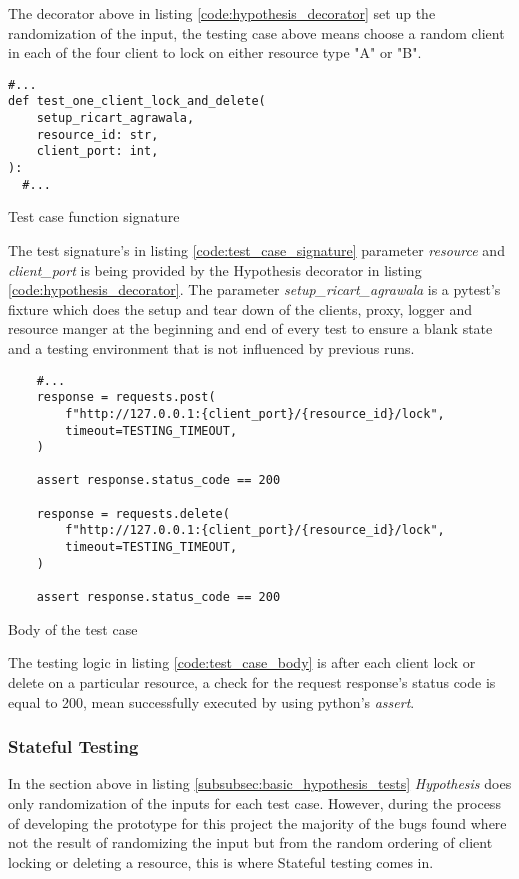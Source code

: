 The decorator above in listing \ref{code:hypothesis_decorator} set up the randomization of the input, the testing case above 
means choose a random client in each of the four client to lock on either resource 
type "A" or "B".

\begin{listing}[!ht]
  \begin{verbatim}
#...
def test_one_client_lock_and_delete(
    setup_ricart_agrawala,
    resource_id: str,
    client_port: int,
):
  #...
  \end{verbatim}
  \caption{Test case function signature}
  \label{code:test_case_signature}
\end{listing}

The test signature's in listing \ref{code:test_case_signature} parameter \textit{resource} 
and \textit{client\_port} is being provided by the Hypothesis decorator 
in listing \ref{code:hypothesis_decorator}. The parameter \textit{setup\_ricart\_agrawala}
is a pytest's fixture which does the setup and tear down of the clients, proxy, logger 
and resource manger at the beginning and end of every test to ensure a blank state 
and a testing environment that is not influenced by previous runs.

\begin{listing}[!ht]
  \begin{verbatim}
    #...
    response = requests.post(
        f"http://127.0.0.1:{client_port}/{resource_id}/lock",
        timeout=TESTING_TIMEOUT,
    )

    assert response.status_code == 200

    response = requests.delete(
        f"http://127.0.0.1:{client_port}/{resource_id}/lock",
        timeout=TESTING_TIMEOUT,
    )

    assert response.status_code == 200
  \end{verbatim}
  \caption{Body of the test case}
  \label{code:test_case_body}
\end{listing}


The testing logic in listing \ref{code:test_case_body} is after each client lock or delete
on a particular resource, a check for the request response's status code is equal 
to 200, mean successfully executed by using python's \textit{assert}.

\subsubsection{Stateful Testing}
\label{subsubsec:stateful_testing}
In the section above in listing \ref{subsubsec:basic_hypothesis_tests} \textit{Hypothesis} 
does only randomization of the inputs for each test case. However, during the process
of developing the prototype for this project the majority of the bugs found where
not the result of randomizing the input but from the random ordering of client 
locking or deleting a resource, this is where Stateful testing comes in.


